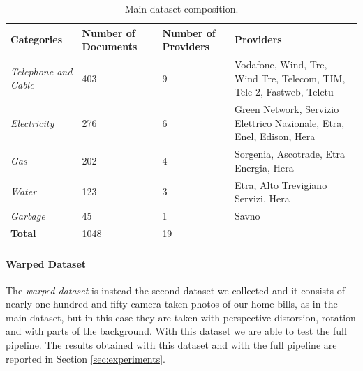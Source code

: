 \documentclass[10pt,twocolumn,letterpaper]{article}
\begin{document}
\bgroup
\def\arraystretch{1.5}%
\begin{table}[!h]
  \begin{center}
    \begin{tabular}{p{1.5cm} p{1.2cm} p{1.2cm} p{3cm}}
      \hline
      Categories                 & Number of Documents & Number of Providers & Providers                                                             \\ \hline
      \emph{Telephone and Cable} & 403                 & 9                   & Vodafone, Wind, Tre, Wind Tre, Telecom, TIM, Tele 2, Fastweb, Teletu  \\
      \emph{Electricity}         & 276                 & 6                   & Green Network, Servizio Elettrico Nazionale, Etra, Enel, Edison, Hera \\
      \emph{Gas}                 & 202                 & 4                   & Sorgenia, Ascotrade, Etra Energia, Hera                               \\
      \emph{Water}               & 123                 & 3                   & Etra, Alto Trevigiano Servizi, Hera                                   \\
      \emph{Garbage}             & 45                  & 1                   & Savno                                                                 \\ \hline
      \textbf{Total}             & 1048                & 19                  &                                                                       \\ \hline
    \end{tabular}
  \end{center}
  \label{table:main-dataset}
  \caption{Main dataset composition.}
\end{table}
\egroup

\paragraph{Warped Dataset}
\label{par:warped-dataset}

The \emph{warped dataset} is instead the second dataset we collected and it 
consists of nearly one hundred and fifty camera taken photos of our
home bills, as in the main dataset, but in this case they are taken
with perspective distorsion, rotation and with parts of the
background. With this dataset we are able to test the full
pipeline. The results obtained with this dataset and with the full
pipeline are reported in Section \ref{sec:experiments}.
\end{document}
